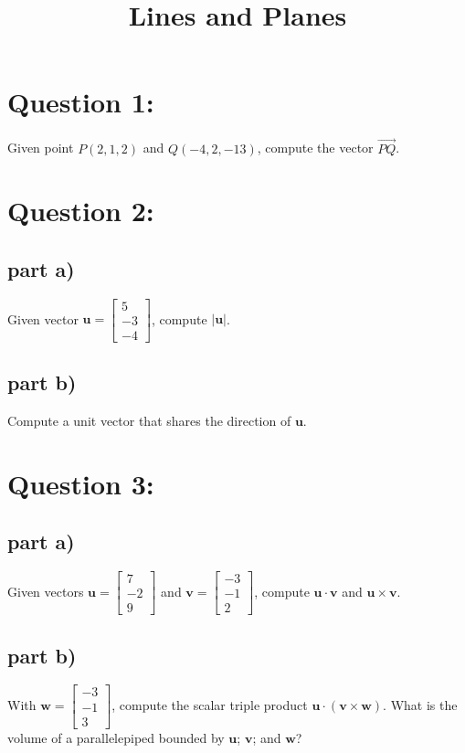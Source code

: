 \documentclass{article}
\title{Lines and Planes}
\date{}
\newcommand{\abs}[1]{\left|#1\right|}
\newcommand{\colvec}[3]{\begin{bmatrix} #1 \\ #2 \\ #3 \end{bmatrix}}
\newcommand{\pvec}[1]{\overrightarrow{#1}}
\begin{document}
\maketitle


\section*{Question 1:}

Given point \(P(2,1,2)\) and \(Q(-4,2,-13)\), compute the vector \(\pvec{PQ}\).



\section*{Question 2:}

\subsection*{part a)}

Given vector \(\mathbf{u} = \colvec{5}{-3}{-4}\), compute \(\abs{\mathbf{u}}\). 

\subsection*{part b)}

Compute a unit vector that shares the direction of \(\mathbf{u}\). 



\section*{Question 3:}

\subsection*{part a)}

Given vectors \(\mathbf{u} = \colvec{7}{-2}{9}\) and \(\mathbf{v} = \colvec{-3}{-1}{2}\), compute \(\mathbf{u} \cdot \mathbf{v}\) and \(\mathbf{u} \times \mathbf{v}\).   

\subsection*{part b)}

With \(\mathbf{w} = \colvec{-3}{-1}{3}\), compute the scalar triple product \(\mathbf{u} \cdot (\mathbf{v} \times \mathbf{w})\). What is the volume of a parallelepiped bounded by \(\mathbf{u}\); \(\mathbf{v}\); and \(\mathbf{w}\)? 
\end{document}
